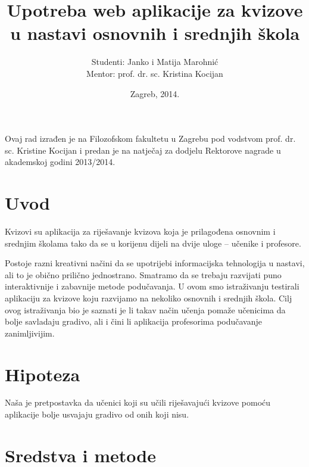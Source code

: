 \documentclass{scrreprt}
\begin{document}
\titlehead{Sveučilište u Zagrebu\\Filozofski fakultet\\Odsijek za informacijske
i komunikacijske znanosti\\Akademska godina 2013/14.}
\title{Upotreba web aplikacije za kvizove u nastavi osnovnih i srednjih škola}
\author{Studenti: Janko i Matija Marohnić\\Mentor: prof. dr. sc. Kristina
Kocijan}
\date{Zagreb, 2014.}

\maketitle

\pagebreak

Ovaj rad izrađen je na Filozofskom fakultetu u Zagrebu pod vodstvom prof. dr.
sc. Kristine Kocijan i predan je na natječaj za dodjelu Rektorove nagrade u
akademskoj godini 2013/2014.

\pagebreak

\tableofcontents

\chapter{Uvod}

Kvizovi su aplikacija za riješavanje kvizova koja je prilagođena osnovnim i
srednjim školama tako da se u korijenu dijeli na dvije uloge -- učenike i
profesore.

Postoje razni kreativni načini da se upotrijebi informacijska tehnologija u
nastavi, ali to je obično prilično jednostrano. Smatramo da se trebaju razvijati
puno interaktivnije i zabavnije metode podučavanja. U ovom smo istraživanju
testirali aplikaciju za kvizove koju razvijamo na nekoliko osnovnih i srednjih
škola. Cilj ovog istraživanja bio je saznati je li takav način učenja pomaže
učenicima da bolje savladaju gradivo, ali i čini li aplikacija profesorima
podučavanje zanimljivijim.

\chapter{Hipoteza}

Naša je pretpostavka da učenici koji su učili riješavajući kvizove pomoću
aplikacije bolje usvajaju gradivo od onih koji nisu.

\chapter{Sredstva i metode}
\end{document}
